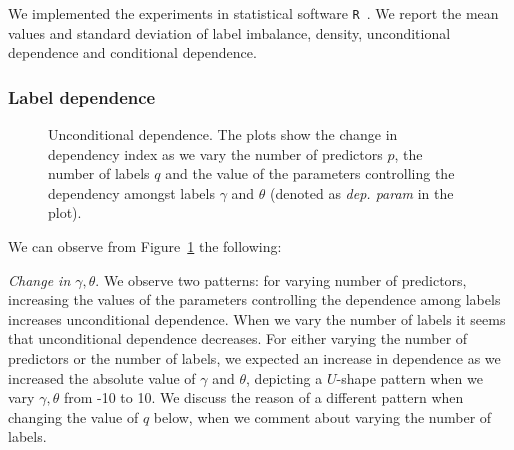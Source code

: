 \documentclass[review]{elsarticle}
\begin{document}
	We implemented the experiments in statistical software \texttt{R}~\citep{RR}. We report the mean values and standard deviation of label imbalance, density, unconditional dependence and conditional dependence.
		
		\subsubsection{Label dependence}
		
		\begin{figure}[H]
			\begin{center}
			\end{center}
			\caption{Unconditional dependence. The plots show the change in dependency index as we vary the number of predictors $p$, the number of labels $q$ and the value of the parameters controlling the dependency amongst labels $\gamma$ and $\theta$ (denoted as \emph{dep. param} in the plot).}
			\label{fig:results:dep}
		\end{figure}
		
		We can observe from Figure~\ref{fig:results:dep} the following:
		
		\emph{Change in $\gamma,\theta$}. We observe two patterns: for varying number of predictors, increasing the values of the parameters controlling the dependence among labels increases unconditional dependence. When we vary the number of labels it seems that unconditional dependence decreases. For either varying the number of predictors or the number of labels, we expected an increase in dependence as we increased the absolute value of $\gamma$ and $\theta$, depicting a $U$-shape pattern when we vary $\gamma, \theta$ from -10 to 10. We discuss the reason of a different pattern when changing the value of $q$ below, when we comment about varying the number of labels.
		
\end{document}
